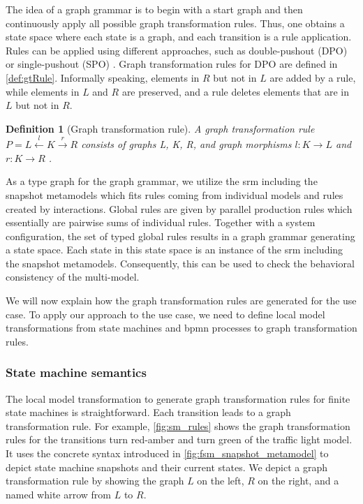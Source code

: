 \documentclass{jot}
\newtheorem{definition}{Definition}
\begin{document}
The idea of a graph grammar is to begin with a start graph and then continuously apply all possible graph transformation rules.
Thus, one obtains a state space where each state is a graph, and each transition is a rule application.
Rules can be applied using different approaches, such as double-pushout (DPO) \cite{ehrigFundamentalsAlgebraicGraph2006} or single-pushout (SPO) \cite{loweAlgebraicApproachSinglepushout1993}.
Graph transformation rules for DPO are defined in \autoref{def:gtRule}.
Informally speaking, elements in $R$ but not in $L$ are added by a rule, while elements in $L$ and $R$ are preserved, and a rule deletes elements that are in $L$ but not in $R$.

\begin{definition}[Graph transformation rule] \label{def:gtRule}
A graph transformation rule $P= L \overset{l}{\leftarrow} K \overset{r}{\to} R$ consists of graphs L, K, R, and graph morphisms $l: K \to L$ and $r: K \to R$ \cite{ehrigFundamentalsAlgebraicGraph2006}. 
\end{definition}

As a type graph for the graph grammar, we utilize the \gls*{srm} including the snapshot metamodels which fits rules coming from individual models and rules created by interactions.
Global rules are given by parallel production rules \cite[Definition 3.2.7]{baldanConcurrentSemanticsAlgebraic1999} which essentially are pairwise sums of individual rules.
Together with a system configuration, the set of typed global rules results in a graph grammar generating a state space.
Each state in this state space is an instance of the \gls*{srm} including the snapshot metamodels.
Consequently, this can be used to check the behavioral consistency of the multi-model.

We will now explain how the graph transformation rules are generated for the use case.
To apply our approach to the use case, we need to define local model transformations from state machines and \gls*{bpmn} processes to graph transformation rules.


\subsubsection{State machine semantics}
The local model transformation to generate graph transformation rules for finite state machines is straightforward.
Each transition leads to a graph transformation rule.
For example, \cref{fig:sm_rules} shows the graph transformation rules for the transitions \textsf{turn red-amber} and \textsf{turn green} of the traffic light model.
It uses the concrete syntax introduced in \cref{fig:fsm_snapshot_metamodel} to depict state machine snapshots and their current states.
We depict a graph transformation rule by showing the graph $L$ on the left, $R$ on the right, and a named white arrow from $L$ to $R$.
\end{document}
